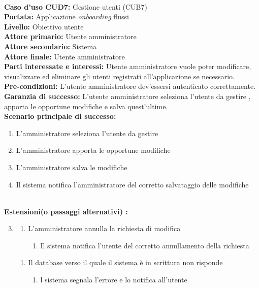 \ \\
\textbf{Caso d’uso CUD7:} Gestione utenti (CUB7) \\
\textbf{Portata:} Applicazione \textit{onboarding} flussi\\
\textbf{Livello:} Obiettivo utente \\
\textbf{Attore primario:} Utente amministratore \\
\textbf{Attore secondario:} Sistema \\
\textbf{Attore finale:} Utente amministratore \\
\textbf{Parti interessate e interessi:} 
Utente amministratore vuole poter modificare, visualizzare ed eliminare gli utenti registrati all'applicazione se necessario.\\
\textbf{Pre-condizioni:} L’utente amministratore dev'essersi autenticato correttamente.\\
\textbf{Garanzia di successo:} L'utente amministratore seleziona l'utente da gestire , apporta le opportune modifiche e salva quest'ultime.\\
\textbf{Scenario principale di successo:} 
\begin{enumerate}
  \item L'amministratore seleziona l'utente da gestire
  \item L'amministratore apporta le opportune modifiche
  \item L'amministratore salva le modifiche
  \item Il sistema notifica l'amministratore del corretto salvataggio delle modifiche
\end{enumerate} 
\  \\
\textbf{Estensioni(o passaggi alternativi) :}
\begin{enumerate}
\setcounter{enumi}{2}
\item
    \begin{enumerate}
        \item L'amministratore annulla la richiesta di modifica
        \begin{enumerate}
            \item Il sistema notifica l'utente del corretto annullamento della richiesta
        \end{enumerate}
    \end{enumerate}
    \begin{enumerate}
        \item Il database verso il quale il sistema è in scrittura non risponde
        \begin{enumerate}
            \item l sistema segnala l’errore e lo notifica all’utente
        \end{enumerate}
    \end{enumerate}
 \end{enumerate} 
 
